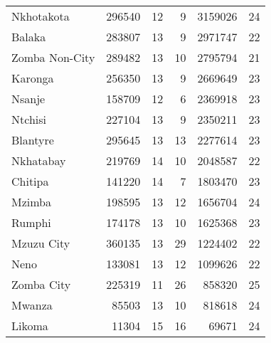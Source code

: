 \begin{tabular}{lrrrrr}
Nkhotakota     &      296540 &          12 &            9 &          3159026 &          24 \\
Balaka         &      283807 &          13 &            9 &          2971747 &          22 \\
Zomba Non-City &      289482 &          13 &           10 &          2795794 &          21 \\
Karonga        &      256350 &          13 &            9 &          2669649 &          23 \\
Nsanje         &      158709 &          12 &            6 &          2369918 &          23 \\
Ntchisi        &      227104 &          13 &            9 &          2350211 &          23 \\
Blantyre       &      295645 &          13 &           13 &          2277614 &          23 \\
Nkhatabay      &      219769 &          14 &           10 &          2048587 &          22 \\
Chitipa        &      141220 &          14 &            7 &          1803470 &          23 \\
Mzimba         &      198595 &          13 &           12 &          1656704 &          24 \\
Rumphi         &      174178 &          13 &           10 &          1625368 &          23 \\
Mzuzu City     &      360135 &          13 &           29 &          1224402 &          22 \\
Neno           &      133081 &          13 &           12 &          1099626 &          22 \\
Zomba City     &      225319 &          11 &           26 &           858320 &          25 \\
Mwanza         &       85503 &          13 &           10 &           818618 &          24 \\
Likoma         &       11304 &          15 &           16 &            69671 &          24 \\
\bottomrule
\end{tabular}
